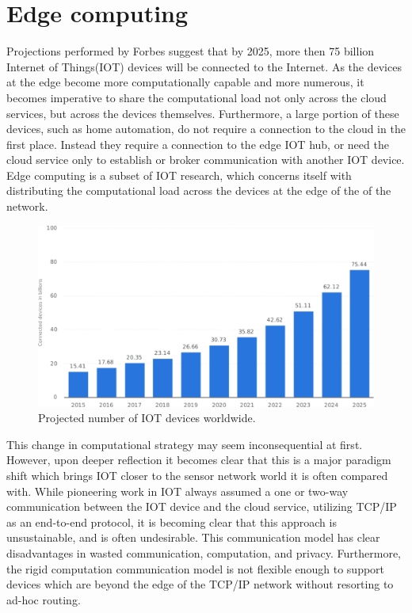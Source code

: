 \section{Edge computing}\label{sec:lit:edge-computing}
Projections performed by Forbes suggest that by 2025, more then 75 billion Internet of Things(IOT) devices will be connected to the Internet.\cite{forbesiot}
As the devices at the edge become more computationally capable and more numerous, it becomes imperative to share the computational load not only across the cloud services, but across the devices themselves.
Furthermore, a large portion of these devices, such as home automation, do not require a connection to the cloud in the first place.
Instead they require a connection to the edge IOT hub, or need the cloud service only to establish or broker communication with another IOT device.
Edge computing is a subset of IOT research, which concerns itself with distributing the computational load across the devices at the edge of the of the network. \cite{satyanarayanan2017emergence}
\begin{figure}[h]
    \centering
    \includegraphics[width=0.8\linewidth]{img/iot_statistics.pdf}
    \caption{Projected number of IOT devices worldwide.\cite{forbesiot}}
    \label{lit:fig:1}
\end{figure}

This change in computational strategy may seem inconsequential at first.
However, upon deeper reflection it becomes clear that this is a major paradigm shift which brings IOT closer to the sensor network world it is often compared with.
While pioneering work in IOT always assumed a one or two-way communication between the IOT device and the cloud service, utilizing TCP/IP as an end-to-end protocol, it is becoming clear that this approach is unsustainable, and is often undesirable.
This communication model has clear disadvantages in wasted communication, computation, and privacy.
Furthermore, the rigid computation communication model is not flexible enough to support devices which are beyond the edge of the TCP/IP network without resorting to ad-hoc routing. \cite{gagliardi2011content}

